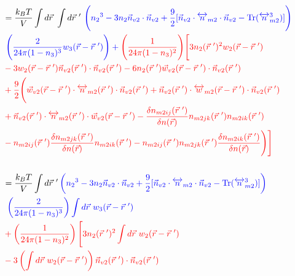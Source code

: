 \documentclass[double,12pt]{revtex4-2}
\begin{document}
\begin{align}   %
&=\frac{k_BT}{V}\int d\vec r~\int d\vec r~'~ \color{blue}\Bigg( {n_2}^3-3n_2
    \vec{n}_{v2}\cdot\vec{n}_{v2} 
     +\frac{9}{2}[\vec{n}_{v2}\cdot{\overleftrightarrow{n}_{m2}}\cdot{
     \vec{n}_{v2}}-\operatorname{Tr}({\overleftrightarrow{n}^3_{m2}})]
     \Bigg) \nonumber\\
     &~\color{blue}\Bigg(\frac{2}{24\pi(1-n_3)^3} w_3(\vec r-\vec r~')
     \Bigg) 
     + \color{red}\Bigg(\frac{1}{24\pi(1-n_3)^2}\Bigg)
     \Bigg[
     3n_2(\vec r~')^2
     w_2(\vec r-\vec r~') \nonumber\\
     &\color{red}- 3w_2(\vec r-\vec r~')\vec n_{v2}
     (\vec r~') \cdot \vec n_{v2}(\vec r~') - 6n_2(\vec r~')
     \vec w_{v2}(\vec r-\vec r~')\cdot \vec n_{v2}(\vec r~') \nonumber \\
     &\color{red}+\frac{9}{2}\Bigg(\vec w_{v2}
     (\vec r-\vec r~')
     \cdot \overleftrightarrow n_{m2}(\vec r~')\cdot \vec n_{v2}( \vec r~')
     +\vec n_{v2}(\vec r~')\cdot \overleftrightarrow w_{m2}(\vec r-\vec r~')
     \cdot \vec n_{v2}( \vec r~') \nonumber\\
     &\color{red}+ \vec n_{v2}(\vec r~')\cdot \overleftrightarrow n_{m2}(\vec r~') 
     \cdot \vec w_{v2}(\vec r-\vec r~')
     -\frac{\delta n_{m2ij}(\vec r~')}{\delta n(\vec r)}n_{m2jk}(\vec r~')
     n_{m2ik}(\vec r~') \nonumber \\     
     &\color{red}-n_{m2ij}(\vec r~')\frac{\delta n_{m2jk}(\vec r~')}
     {\delta n(\vec r)}n_{m2ik}(\vec r~') - n_{m2ij}(\vec r~')n_{m2jk}
     (\vec r~')\frac{\delta n_{m2ik}(\vec r~')}
     {\delta n(\vec r)}\Bigg)
     \Bigg]   \\ \nonumber \\
%
&=\frac{k_BT}{V}\int d\vec r~' \color{blue}\left( {n_2}^3-3n_2
    \vec{n}_{v2}\cdot\vec{n}_{v2} 
     +\frac{9}{2}[\vec{n}_{v2}\cdot{\overleftrightarrow{n}_{m2}}\cdot{
     \vec{n}_{v2}}-\operatorname{Tr}({\overleftrightarrow{n}^3_{m2}})]
     \right) \nonumber\\
     &\color{blue}~\left(\frac{2}{24\pi(1-n_3)^3}\right) \int d\vec r~ w_3(\vec r
     -\vec r~') \nonumber\\
     &\color{red}+\left(\frac{1}{24\pi(1-n_3)^2}\right)
     \Bigg[ 
     3n_2(\vec r~')^2
     \int d\vec r~ w_2(\vec r-\vec r~') 
     \nonumber \\
     &\color{red}-3\left(\int d\vec r ~w_2(\vec r-\vec r~')\right)\vec n_{v2}(\vec r~')
     \cdot \vec n_{v2}(\vec r~') \nonumber\\

\end{align}
\end{document}
